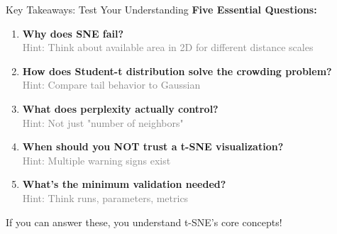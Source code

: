 \documentclass[aspectratio=169]{beamer}
\begin{document}
\begin{frame}{Key Takeaways: Test Your Understanding}
\textbf{Five Essential Questions:}

\begin{enumerate}
\item \textbf{Why does SNE fail?}\\
\textcolor{gray}{\small Hint: Think about available area in 2D for different distance scales}

\item \textbf{How does Student-t distribution solve the crowding problem?}\\
\textcolor{gray}{\small Hint: Compare tail behavior to Gaussian}

\item \textbf{What does perplexity actually control?}\\
\textcolor{gray}{\small Hint: Not just "number of neighbors"}

\item \textbf{When should you NOT trust a t-SNE visualization?}\\
\textcolor{gray}{\small Hint: Multiple warning signs exist}

\item \textbf{What's the minimum validation needed?}\\
\textcolor{gray}{\small Hint: Think runs, parameters, metrics}
\end{enumerate}

\vspace{0.5cm}
\begin{center}
\colorbox{green!20}{If you can answer these, you understand t-SNE's core concepts!}
\end{center}
\end{frame}
\end{document}

